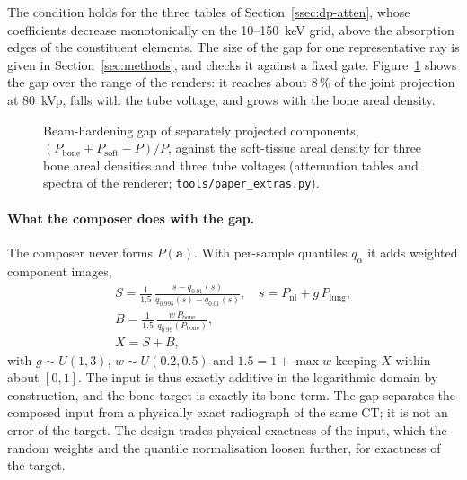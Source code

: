 The condition holds for the three tables of Section~\ref{ssec:dp-atten}, whose coefficients decrease monotonically on the 10--150~keV grid,
above the absorption edges of the constituent elements. The size of the gap for one representative ray is given in Section~\ref{sec:methods}, and
 checks it against a fixed gate.
Figure~\ref{fig:additivity_gap} shows the gap over the range of the renders: it reaches about 8\,\% of the joint projection at 80~kVp, falls
with the tube voltage, and grows with the bone areal density.
\begin{figure}[htbp]
\centering
{}
\caption{Beam-hardening gap of separately projected components, $(P_{\mathrm{bone}}+P_{\mathrm{soft}}-P)/P$, against the soft-tissue areal
density for three bone areal densities and three tube voltages (attenuation tables and spectra of the renderer; \texttt{tools/paper\_extras.py}).}
\label{fig:additivity_gap}
\end{figure}

\paragraph{What the composer does with the gap.} The composer never forms $P(\mathbf a)$. With per-sample quantiles $q_\alpha$ it adds weighted
component images,
\begin{equation}
\begin{gathered}
S=\frac{1}{1.5}\,\frac{s-q_{0.01}(s)}{q_{0.995}(s)-q_{0.01}(s)},\quad s=P_{\mathrm{nl}}+g\,P_{\mathrm{lung}},\\
B=\frac{1}{1.5}\,\frac{w\,P_{\mathrm{bone}}}{q_{0.99}(P_{\mathrm{bone}})},\\
X=S+B,
\end{gathered}
\label{eq:dp-compose}
\end{equation}
with $g\sim U(1,3)$, $w\sim U(0.2,0.5)$ and $1.5=1+\max w$ keeping $X$ within about $[0,1]$. The input is thus exactly additive in the logarithmic
domain by construction, and the bone target is exactly its bone term. The gap separates the composed input from a physically exact radiograph of
the same CT; it is not an error of the target. The design trades physical exactness of the input, which the random weights and the quantile
normalisation loosen further, for exactness of the target.

